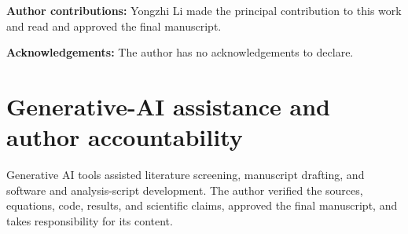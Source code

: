 \documentclass[11pt]{article}
\begin{document}
\medskip\noindent\textbf{Author contributions:} Yongzhi Li made the principal
contribution to this work and read and approved the final manuscript.

\medskip\noindent\textbf{Acknowledgements:} The author has no acknowledgements
to declare.

\section*{Generative-AI assistance and author accountability}
Generative AI tools assisted literature screening, manuscript drafting, and
software and analysis-script development. The author verified the sources,
equations, code, results, and scientific claims, approved the final manuscript,
and takes responsibility for its content.
\end{document}
